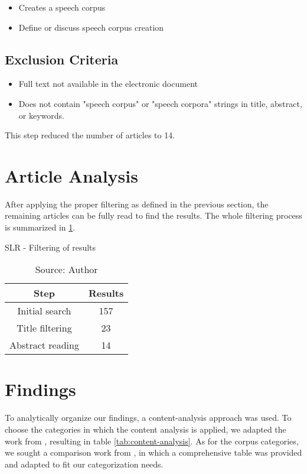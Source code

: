 \begin{itemize}
    \item Creates a speech corpus
    \item Define or discuss speech corpus creation
\end{itemize}

\subsection{Exclusion Criteria}

\begin{itemize}
    \item Full text not available in the electronic document
    \item Does not contain "speech corpus" or "speech corpora" strings in title, abstract, or keywords.
\end{itemize}

This step reduced the number of articles to 14.

\section{Article Analysis}

After applying the proper filtering as defined in the previous section, the remaining articles can be fully read to find the results. The whole filtering process is summarized in \ref{tab:filtering}.

\begin{table}[h]
    \centering
    \caption{SLR - Filtering of results}
    \begin{tabular}{|c|c|}
        \hline Step & Results \\ \hline
        Initial search & 157 \\ \hline
        Title filtering & 23 \\ \hline
        Abstract reading & 14 \\ \hline
    \end{tabular}
    \caption*{Source: Author}
    \label{tab:filtering}
\end{table}

\section{Findings}

To analytically organize our findings, a content-analysis approach was used. To choose the categories in which the content analysis is applied, we adapted the work from \cite{queiroz2019blockchain}, resulting in table \ref{tab:content-analysis}. As for the corpus categories, we sought a comparison work from  \cite{LeRouxVincent2014TRdatasets}, in which a comprehensive table was provided and adapted to fit our categorization needs.


